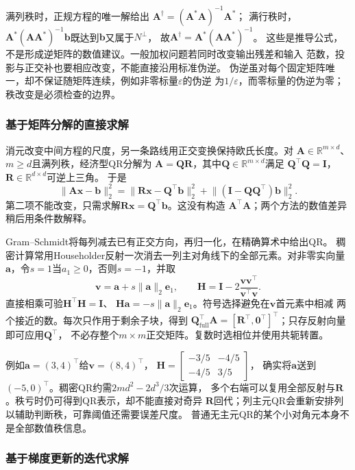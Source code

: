 满列秩时，正规方程的唯一解给出
$\bm A^\dagger=(\bm A^*\bm A)^{-1}\bm A^*$；
满行秩时，$\bm A^*(\bm A\bm A^*)^{-1}\bm b$既达到$\bm b$又属于$N^\perp$，
故$\bm A^\dagger=\bm A^*(\bm A\bm A^*)^{-1}$。
这些是推导公式，不是形成逆矩阵的数值建议。一般加权问题若同时改变输出残差和输入
范数，投影与正交补也要相应改变，不能直接沿用标准伪逆。
伪逆虽对每个固定矩阵唯一，却不保证随矩阵连续，例如非零标量$\varepsilon$的伪逆
为$1/\varepsilon$，而零标量的伪逆为零；秩改变是必须检查的边界。

\subsubsection{基于矩阵分解的直接求解}
\label{sec:linear-algebra-direct-residual}

消元改变中间方程的尺度，另一条路线用正交变换保持欧氏长度。对
$\bm A\in\mathbb R^{m\times d}$、$m\geq d$且满列秩，经济型QR分解为
$\bm A=\bm Q\bm R$，其中$\bm Q\in\mathbb R^{m\times d}$满足
$\bm Q^\top\bm Q=\bm I$，$\bm R\in\mathbb R^{d\times d}$可逆上三角。
于是
\[
 \lVert\bm A\bm x-\bm b\rVert_2^2
 =\lVert\bm R\bm x-\bm Q^\top\bm b\rVert_2^2
  +\lVert(\bm I-\bm Q\bm Q^\top)\bm b\rVert_2^2.
\]
第二项不能改变，只需求解$\bm R\bm x=\bm Q^\top\bm b$。这没有构造
$\bm A^\top\bm A$；两个方法的数值差异稍后用条件数解释。

Gram--Schmidt将每列减去已有正交方向，再归一化，在精确算术中给出QR。
稠密计算常用Householder反射一次消去一列主对角线下的全部元素。对非零实向量
$\bm a$，令$s=1$当$a_1\geq0$，否则$s=-1$，并取
\[
 \bm v=\bm a+s\lVert\bm a\rVert_2\bm e_1,\qquad
 \bm H=\bm I-2\frac{\bm v\bm v^\top}{\bm v^\top\bm v}.
\]
直接相乘可验$\bm H^\top\bm H=\bm I$、
$\bm H\bm a=-s\lVert\bm a\rVert_2\bm e_1$。符号选择避免在$\bm v$首元素中相减
两个接近的数。每次只作用于剩余子块，得到
$\bm Q_{\mathrm{full}}^\top\bm A=
[\bm R^\top,\bm0^\top]^\top$；只存反射向量即可应用$\bm Q^\top$，
不必存整个$m\times m$正交矩阵。复数时选相位并使用共轭转置。

例如$\bm a=(3,4)^\top$给$\bm v=(8,4)^\top$，
$\bm H=\left[\begin{smallmatrix}-3/5&-4/5\\-4/5&3/5\end{smallmatrix}\right]$，
确实将$\bm a$送到$(-5,0)^\top$。稠密QR约需$2md^2-2d^3/3$次运算，
多个右端可以复用全部反射与$\bm R$。秩亏时仍可得到QR表示，却不能直接对奇异
$\bm R$回代；列主元QR会重新安排列以辅助判断秩，可靠阈值还需要误差尺度。
普通无主元QR的某个小对角元本身不是全部数值秩信息。

\subsubsection{基于梯度更新的迭代求解}
\label{sec:linear-algebra-gradient-residual}

